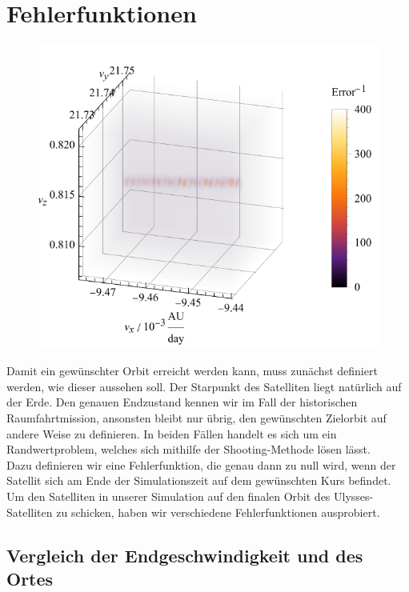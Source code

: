 \section{Fehlerfunktionen}
\begin{figure}[h!]
	\centering
	\includegraphics{img/gridSearch.pdf}
	\label{fig:gridSearch}
\end{figure}

Damit ein gewünschter Orbit erreicht werden kann, muss zunächst definiert werden, wie dieser aussehen soll. Der Starpunkt des Satelliten liegt natürlich auf der Erde. Den genauen Endzustand kennen wir im Fall der historischen Raumfahrtmission, ansonsten bleibt nur übrig, den gewünschten Zielorbit auf andere Weise zu definieren. In beiden Fällen handelt es sich um ein Randwertproblem, welches sich mithilfe der Shooting-Methode lösen lässt.\\
Dazu definieren wir eine Fehlerfunktion, die genau dann zu null wird, wenn der Satellit sich am Ende der Simulationszeit auf dem gewünschten Kurs befindet.
Um den Satelliten in unserer Simulation auf den finalen Orbit des Ulysses-Satelliten zu schicken, haben wir verschiedene Fehlerfunktionen ausprobiert.


\subsection{Vergleich der Endgeschwindigkeit und des Ortes}

